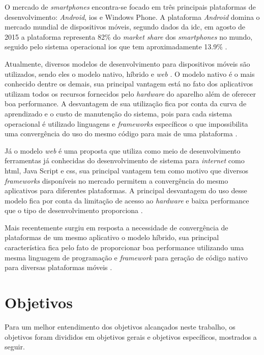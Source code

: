 O mercado de \textit{smartphones} encontra-se focado em três principais plataformas de desenvolvimento:  \textit{Android}, \gls{ios} e Windows Phone. A plataforma \textit{Android} domina o mercado mundial de dispositivos móveis, segundo dados da \gls{idc}, em agosto de 2015 a plataforma representa 82\% do \textit{market share} dos \textit{smartphones} no mundo, seguido pelo sistema operacional \acrshort{ios} que tem aproximadamente 13.9\% \cite{pesquisa-idc}.

Atualmente, diversos modelos de desenvolvimento para dispositivos móveis são utilizados, sendo eles o modelo nativo, híbrido e \textit{web} \cite{charland2011mobile}. O modelo nativo é o mais conhecido dentre os demais, sua principal vantagem está no fato dos aplicativos utilizam todos os recursos fornecidos pelo \textit{hardware} do aparelho além de oferecer boa performance. A desvantagem de sua utilização fica por conta da curva de aprendizado e o custo de manutenção do sistema, pois para cada sistema operacional é utilizado linguagens e \textit{frameworks} específicos o que impossibilita uma convergência do uso do mesmo código para mais de uma plataforma \cite{charland2011mobile}.

Já o modelo \textit{web} é uma proposta que utiliza como meio de desenvolvimento ferramentas já conhecidas do desenvolvimento de sistema para \textit{internet} como \gls{html}, Java Script e \gls{css}, sua principal vantagem tem como motivo que diversos \textit{frameworks} disponíveis no mercado permitem a convergência do mesmo aplicativos para diferentes plataformas. A principal desvantagem do uso desse modelo fica por conta da limitação de acesso ao \textit{hardware} e baixa performance que o tipo de desenvolvimento proporciona \cite{charland2011mobile}.

Mais recentemente surgiu em resposta a necessidade de convergência de plataformas de um mesmo aplicativo o modelo híbrido, sua principal característica fica pelo fato de proporcionar boa performance utilizando uma mesma linguagem de programação e \textit{framework} para geração de código nativo para diversas plataformas móveis \cite{charland2011mobile}.


\section{Objetivos}

\noindent Para um melhor entendimento dos objetivos alcançados neste trabalho, os objetivos foram
divididos em objetivos gerais e objetivos específicos, mostrados a seguir.

